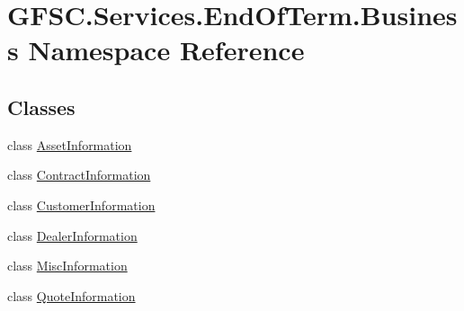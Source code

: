 \hypertarget{namespace_g_f_s_c_1_1_services_1_1_end_of_term_1_1_business}{}\section{G\+F\+S\+C.\+Services.\+End\+Of\+Term.\+Business Namespace Reference}
\label{namespace_g_f_s_c_1_1_services_1_1_end_of_term_1_1_business}
\subsection*{Classes}
\begin{DoxyCompactItemize}
\item 
class \mbox{\hyperlink{class_g_f_s_c_1_1_services_1_1_end_of_term_1_1_business_1_1_asset_information}{Asset\+Information}}
\item 
class \mbox{\hyperlink{class_g_f_s_c_1_1_services_1_1_end_of_term_1_1_business_1_1_contract_information}{Contract\+Information}}
\item 
class \mbox{\hyperlink{class_g_f_s_c_1_1_services_1_1_end_of_term_1_1_business_1_1_customer_information}{Customer\+Information}}
\item 
class \mbox{\hyperlink{class_g_f_s_c_1_1_services_1_1_end_of_term_1_1_business_1_1_dealer_information}{Dealer\+Information}}
\item 
class \mbox{\hyperlink{class_g_f_s_c_1_1_services_1_1_end_of_term_1_1_business_1_1_misc_information}{Misc\+Information}}
\item 
class \mbox{\hyperlink{class_g_f_s_c_1_1_services_1_1_end_of_term_1_1_business_1_1_quote_information}{Quote\+Information}}
\end{DoxyCompactItemize}
